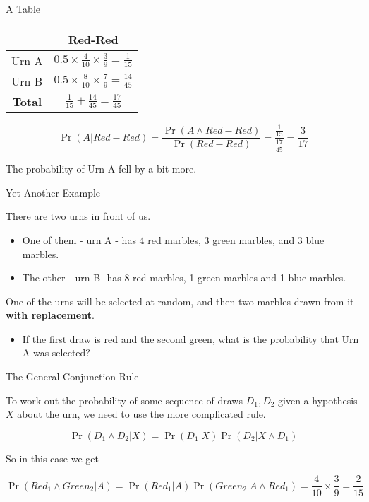 \documentclass[
  ignorenonframetext,
]{beamer}
\providecommand{\tightlist}{%
  \setlength{\itemsep}{0pt}\setlength{\parskip}{0pt}}
\renewcommand{\,}{\text{, }}
\begin{document}
\begin{frame}{A Table}
\protect\hypertarget{a-table-3}{}

\begin{longtable}[]{@{}cc@{}}
\toprule
& Red-Red\tabularnewline
\midrule
\endhead
Urn A &
\(0.5 \times \frac{4}{10} \times \frac{3}{9} = \frac{1}{15}\)\tabularnewline
Urn B &
\(0.5 \times \frac{8}{10} \times \frac{7}{9} = \frac{14}{45}\)\tabularnewline
\textbf{Total} &
\(\frac{1}{15} + \frac{14}{45} = \frac{17}{45}\)\tabularnewline
\bottomrule
\end{longtable}

\pause

\[
\Pr(A | Red-Red) = \frac{\Pr(A \wedge Red-Red)}{\Pr(Red-Red)} = \frac{\frac{1}{15}}{\frac{17}{45}} = \frac{3}{17}
\]

The probability of Urn A fell by a bit more.

\end{frame}

\begin{frame}{Yet Another Example}
\protect\hypertarget{yet-another-example-1}{}

There are two urns in front of us.

\begin{itemize}
\tightlist
\item
  One of them - urn A - has 4 red marbles, 3 green marbles, and 3 blue
  marbles.
\item
  The other - urn B- has 8 red marbles, 1 green marbles and 1 blue
  marbles. \pause
\end{itemize}

One of the urns will be selected at random, and then two marbles drawn
from it \textbf{with replacement}.

\begin{itemize}
\tightlist
\item
  If the first draw is red and the second green, what is the probability
  that Urn A was selected?
\end{itemize}

\end{frame}

\begin{frame}{The General Conjunction Rule}
\protect\hypertarget{the-general-conjunction-rule}{}

To work out the probability of some sequence of draws \(D_1, D_2\) given
a hypothesis \(X\) about the urn, we need to use the more complicated
rule.

\[
\Pr(D_1 \wedge D_2 | X) = \Pr(D_1 | X) \Pr(D_2 | X \wedge D_1)
\]

\pause

So in this case we get

\[
\Pr(Red_1 \wedge Green_2 | A) = \Pr(Red_1 | A)\Pr(Green_2 | A \wedge Red_1) = \frac{4}{10} \times \frac{3}{9} = \frac{2}{15}
\]

\end{frame}
\end{document}
